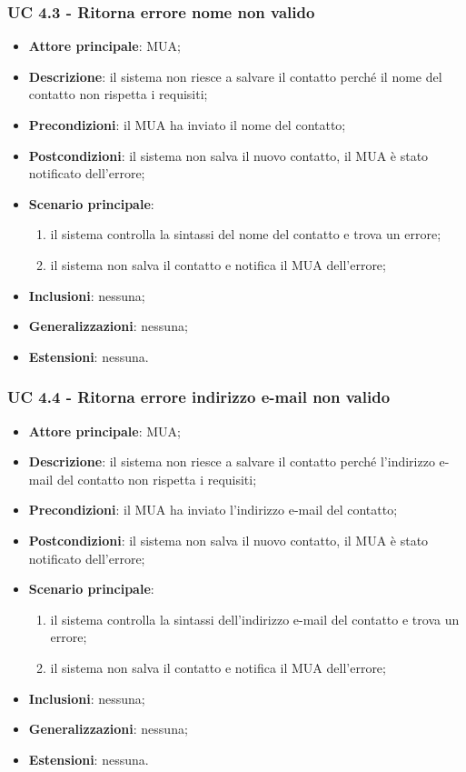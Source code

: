 \subsubsection{UC 4.3 - Ritorna errore nome non valido} \label{sec:UC4.3}
    \begin{itemize}
        \item \textbf{Attore principale}: MUA;
        \item \textbf{Descrizione}: il sistema non riesce a salvare il contatto perché il nome del contatto non rispetta i requisiti;
        \item \textbf{Precondizioni}: il MUA ha inviato il nome del contatto;
        \item \textbf{Postcondizioni}: il sistema non salva il nuovo contatto, il MUA è stato notificato dell'errore;
        \item \textbf{Scenario principale}:
            \begin{enumerate}
                \item il sistema controlla la sintassi del nome del contatto e trova un errore;
                \item il sistema non salva il contatto e notifica il MUA dell'errore;
            \end{enumerate}
        \item \textbf{Inclusioni}: nessuna;
        \item \textbf{Generalizzazioni}: nessuna;
        \item \textbf{Estensioni}: nessuna.
    \end{itemize}

\subsubsection{UC 4.4 - Ritorna errore indirizzo e-mail non valido} \label{sec:UC4.4}
    \begin{itemize}
        \item \textbf{Attore principale}: MUA;
        \item \textbf{Descrizione}: il sistema non riesce a salvare il contatto perché l'indirizzo e-mail del contatto non rispetta i requisiti;
        \item \textbf{Precondizioni}: il MUA ha inviato l'indirizzo e-mail del contatto;
        \item \textbf{Postcondizioni}: il sistema non salva il nuovo contatto, il MUA è stato notificato dell'errore;
        \item \textbf{Scenario principale}:
            \begin{enumerate}
                \item il sistema controlla la sintassi dell'indirizzo e-mail del contatto e trova un errore;
                \item il sistema non salva il contatto e notifica il MUA dell'errore;
            \end{enumerate}
        \item \textbf{Inclusioni}: nessuna;
        \item \textbf{Generalizzazioni}: nessuna;
        \item \textbf{Estensioni}: nessuna.
    \end{itemize}